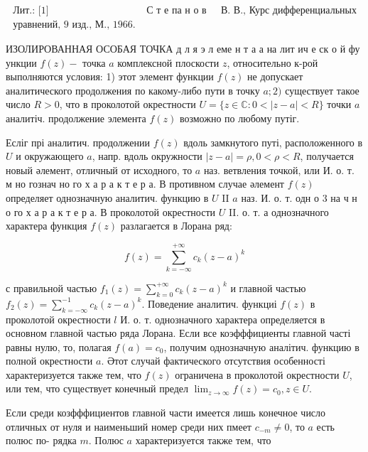 \documentclass[10pt]{article}
\begin{document}
$\begin{array}{rrr}\text { Лит.: [1] } & \text { С т е па н о в } & \text { В. В., Курс дифференциальных } \\ \text { уравнений, } 9 \text { изд., М., } 1966 .\end{array}$



ИЗОЛИРОВАННАЯ ОСОБАЯ ТОЧКА д л я э л еме н т а а на лит ич е ск о й фу ункции $f(z)-$ точка $a$ комплексной плоскости $z$, относительно к-рой выполняются условия: 1) этот элемент функции $f(z)$ не допускает аналитического продолжения по какому-либо пути в точку $a ; 2)$ существует такое число $R>0$, что в проколотой окрестности $U=\{z \in \mathbb{C}: 0<|z-a|<R\}$ точки $a$ аналитіч. продолжение элемента $f(z)$ возможно по любому путіг.



Есліг прі аналитич. продолжении $f(z)$ вдоль замкнутого путі, расположенного в $U$ и окружающего $a$, напр. вдоль окружности $|z-a|=\rho, 0<\rho<R$, получается новый әлемент, отличный от исходного, то $a$ наз. ветвления точкой, или И. о. т. м но гознач но го х а р а к т е р а. В противном случае әлемент $f(z)$ определяет однозначную аналитич. функцию в $U$ II $a$ наз. И. о. т. одн о 3 на ч н о го х а р а к т е р а. В проколотой окрестности $U$ II. о. т. а однозначного характера функция $f(z)$ разлагается в Лорана ряд:



\[

f(z)=\sum_{k=-\infty}^{+\infty} c_{k}(z-a)^{k}

\]



с правильной частью $f_{1}(z)=\sum_{k=0}^{+\infty} c_{k}(z-a)^{k}$ и главной частью $f_{2}(z)=\sum_{k=-\infty}^{-1} c_{k}(z-a)^{k}$. Поведение аналитич. функциі $f(z)$ в проколотой окрестности $l$ И. о. т. однозначного характера определяется в основном главной частью ряда Лорана. Если все коэфффициенты главной часті равны нулю, то, полагая $f(a)=c_{0}$, получим однозначную аналітич. функцию в полной окрестности $a$. Әтот случай фактического отсутствия особенності характеризуется также тем, что $f(z)$ ограничена в проколотой окрестности $U$, или тем, что существует конечный предел $\lim _{z \rightarrow \infty} f(z)=c_{0}, z \in U$.



Если среди козфффициентов главной части имеется лишь конечное число отличных от нуля и наименьший номер среди них пмеет $c_{-m} \neq 0$, то $a$ есть полюс по- рядка $m$. Полюс $a$ характеризуется также тем, что
\end{document}
